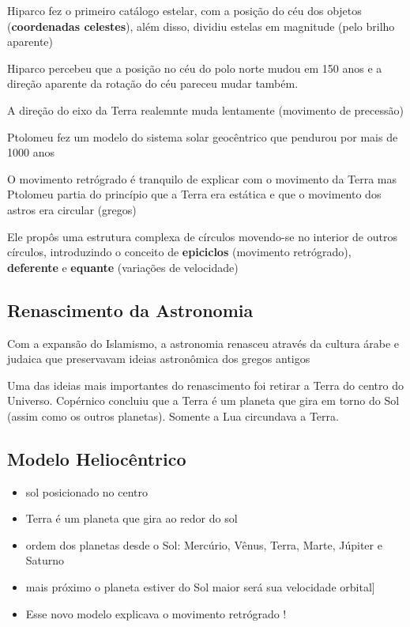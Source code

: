 \documentclass{article}
\begin{document}
Hiparco fez o primeiro catálogo estelar, com a posição do céu dos 
objetos (\textbf{coordenadas celestes}), além disso, dividiu estelas 
em magnitude (pelo brilho aparente)

Hiparco percebeu que a posição no céu do polo norte mudou em 150 anos
e a direção aparente da rotação do céu pareceu mudar também.

A direção do eixo da Terra realemnte muda lentamente (movimento de 
precessão)

Ptolomeu fez um modelo do sistema solar geocêntrico que pendurou 
por mais de 1000 anos



O movimento retrógrado é tranquilo de explicar com o movimento da Terra
mas Ptolomeu partia do princípio que a Terra era estática e que o 
movimento dos astros era circular (gregos)

Ele propôs uma estrutura complexa de círculos movendo-se no interior
de outros círculos, introduzindo o conceito de \textbf{epiciclos} (movimento 
retrógrado), \textbf{deferente} e \textbf{equante} (variações de 
velocidade)

\subsection{Renascimento da Astronomia}

Com a expansão do Islamismo, a astronomia renasceu através da cultura
árabe  e judaica que preservavam ideias astronômica dos gregos 
antigos

Uma das ideias mais importantes 
do renascimento foi retirar a Terra do centro do Universo. Copérnico
concluiu que a Terra é um planeta que gira em torno do Sol (assim 
como os outros planetas). Somente a Lua circundava a Terra. 

\subsection{Modelo Heliocêntrico}

\begin{itemize}
    \item sol posicionado no centro
    \item Terra é um planeta que gira ao redor do sol
    \item ordem dos planetas desde o Sol: Mercúrio, Vênus, Terra, Marte, Júpiter e Saturno
    \item mais próximo o planeta estiver do Sol maior será sua velocidade orbital]
    \item Esse novo modelo explicava o movimento retrógrado !
\end{itemize}
\end{document}
